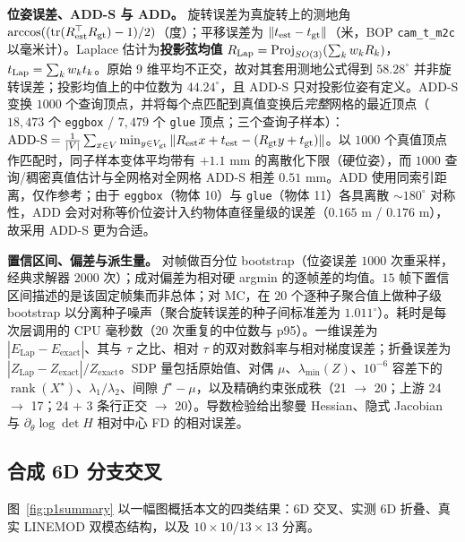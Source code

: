 \textbf{位姿误差、ADD-S 与 ADD。} 旋转误差为真旋转上的测地角 $\arccos((\operatorname{tr}(R_{\rm est}^\top R_{\rm gt})-1)/2)$（度）；平移误差为 $\|t_{\rm est}-t_{\rm gt}\|$（米，BOP \texttt{cam\_t\_m2c} 以毫米计）。Laplace 估计为\textbf{投影弦均值} $R_{\rm Lap}=\mathrm{Proj}_{SO(3)}(\sum_kw_kR_k)$，$t_{\rm Lap}=\sum_kw_kt_k$。原始 9 维平均不正交，故对其套用测地公式得到 $58.28^\circ$ 并非旋转误差；投影均值上的中位数为 $44.24^\circ$，且 ADD-S 只对投影位姿有定义。ADD-S 变换 $1000$ 个查询顶点，并将每个点匹配到真值变换后\emph{完整}网格的最近顶点（$18{,}473$ 个 \texttt{eggbox} / $7{,}479$ 个 \texttt{glue} 顶点；三个查询子样本）：$\mathrm{ADD\text{-}S}=\frac{1}{|V|}\sum_{x\in V}\min_{y\in V_{\rm gt}}\|R_{\rm est}x+t_{\rm est}-(R_{\rm gt}y+t_{\rm gt})\|$。以 $1000$ 个真值顶点作匹配时，同子样本变体平均带有 $+1.1$ mm 的离散化下限（硬位姿），而 $1000$ 查询/稠密真值估计与全网格对全网格 ADD-S 相差 $0.51$ mm。ADD 使用同索引距离，仅作参考；由于 \texttt{eggbox}（物体 10）与 \texttt{glue}（物体 11）各具离散 $\sim180^\circ$ 对称性，ADD 会对对称等价位姿计入约物体直径量级的误差（$0.165$ m / $0.176$ m），故采用 ADD-S 更为合适。

\textbf{置信区间、偏差与派生量。} 对帧做百分位 bootstrap（位姿误差 $1000$ 次重采样，经典求解器 $2000$ 次）；成对偏差为相对硬 argmin 的逐帧差的均值。$15$ 帧下置信区间描述的是该固定帧集而非总体；对 MC，在 $20$ 个逐种子聚合值上做种子级 bootstrap 以分离种子噪声（聚合旋转误差的种子间标准差为 $1.011^\circ$）。耗时是每次层调用的 CPU 毫秒数（$20$ 次重复的中位数与 p95）。一维误差为 $|E_{\mathrm{Lap}}-E_{\mathrm{exact}}|$、其与 $\tau$ 之比、相对 $\tau$ 的双对数斜率与相对梯度误差；折叠误差为 $|Z_{\mathrm{Lap}}-Z_{\mathrm{exact}}|/Z_{\mathrm{exact}}$。SDP 量包括原始值、对偶 $\mu$、$\lambda_{\min}(Z)$、$10^{-6}$ 容差下的 $\operatorname{rank}(X^\star)$、$\lambda_1/\lambda_2$、间隙 $f^\star-\mu$，以及精确约束张成秩（21 $\to$ 20；上游 24 $\to$ 17；24 + 3 条行正交 $\to$ 20）。导数检验给出黎曼 Hessian、隐式 Jacobian 与 $\partial_\theta\log\det H$ 相对中心 FD 的相对误差。

\subsection{合成 6D 分支交叉}\label{sec:synthetic}

图~\ref{fig:p1summary} 以一幅图概括本文的四类结果：6D 交叉、实测 6D 折叠、真实 LINEMOD 双模态结构，以及 $10\times10$/$13\times13$ 分离。

